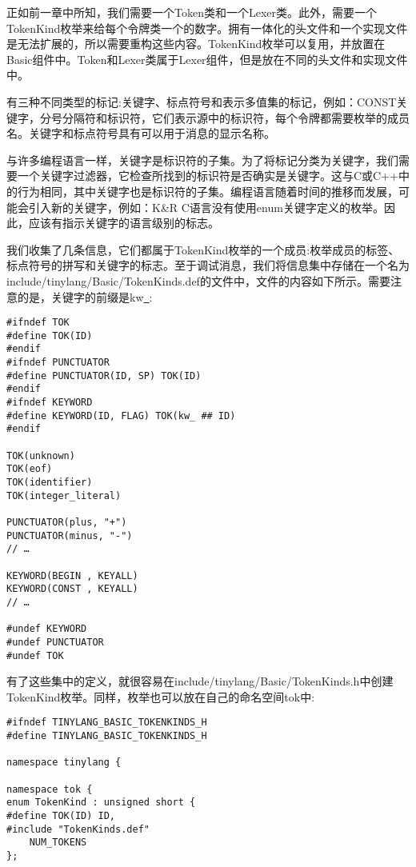 正如前一章中所知，我们需要一个Token类和一个Lexer类。此外，需要一个TokenKind枚举来给每个令牌类一个的数字。拥有一体化的头文件和一个实现文件是无法扩展的，所以需要重构这些内容。TokenKind枚举可以复用，并放置在Basic组件中。Token和Lexer类属于Lexer组件，但是放在不同的头文件和实现文件中。\par

有三种不同类型的标记:关键字、标点符号和表示多值集的标记，例如：CONST关键字，分号分隔符和标识符，它们表示源中的标识符，每个令牌都需要枚举的成员名。关键字和标点符号具有可以用于消息的显示名称。\par

与许多编程语言一样，关键字是标识符的子集。为了将标记分类为关键字，我们需要一个关键字过滤器，它检查所找到的标识符是否确实是关键字。这与C或C++中的行为相同，其中关键字也是标识符的子集。编程语言随着时间的推移而发展，可能会引入新的关键字，例如：K\&R C语言没有使用enum关键字定义的枚举。因此，应该有指示关键字的语言级别的标志。\par

我们收集了几条信息，它们都属于TokenKind枚举的一个成员:枚举成员的标签、标点符号的拼写和关键字的标志。至于调试消息，我们将信息集中存储在一个名为include/tinylang/Basic/Token\allowbreak Kinds.def的文件中，文件的内容如下所示。需要注意的是，关键字的前缀是kw\underline{~}:\par

\begin{lstlisting}[caption={}]
#ifndef TOK
#define TOK(ID)
#endif
#ifndef PUNCTUATOR
#define PUNCTUATOR(ID, SP) TOK(ID)
#endif
#ifndef KEYWORD
#define KEYWORD(ID, FLAG) TOK(kw_ ## ID)
#endif

TOK(unknown)
TOK(eof)
TOK(identifier)
TOK(integer_literal)

PUNCTUATOR(plus, "+")
PUNCTUATOR(minus, "-")
// …

KEYWORD(BEGIN , KEYALL)
KEYWORD(CONST , KEYALL)
// …

#undef KEYWORD
#undef PUNCTUATOR
#undef TOK
\end{lstlisting}

有了这些集中的定义，就很容易在include/tinylang/Basic/TokenKinds.h中创建TokenKind枚举。同样，枚举也可以放在自己的命名空间tok中:\par

\begin{lstlisting}[caption={}]
#ifndef TINYLANG_BASIC_TOKENKINDS_H
#define TINYLANG_BASIC_TOKENKINDS_H

namespace tinylang {
	
namespace tok {
enum TokenKind : unsigned short {
#define TOK(ID) ID,
#include "TokenKinds.def"
	NUM_TOKENS
};
\end{lstlisting}

